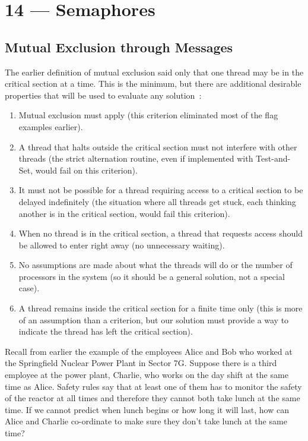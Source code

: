 \documentclass[a4paper]{report}
\begin{document}
\chapter*{14 --- Semaphores}


\section*{Mutual Exclusion through Messages}

The earlier definition of mutual exclusion said only that one thread may be in the critical section at a time. This is the minimum, but there are additional desirable properties that will be used to evaluate any solution~\cite{osi}:
\begin{enumerate}
	\item Mutual exclusion must apply (this criterion eliminated most of the flag examples earlier).
	\item A thread that halts outside the critical section must not interfere with other threads (the strict alternation routine, even if implemented with Test-and-Set, would fail on this criterion).
	\item It must not be possible for a thread requiring access to a critical section to be delayed indefinitely (the situation where all threads get stuck, each thinking another is in the critical section, would fail this criterion).
	\item When no thread is in the critical section, a thread that requests access should be allowed to enter right away (no unnecessary waiting).
	\item No assumptions are made about what the threads will do or the number of processors in the system (so it should be a general solution, not a special case).
	\item A thread remains inside the critical section for a finite time only (this is more of an assumption than a criterion, but our solution must provide a way to indicate the thread has left the critical section).
\end{enumerate}

Recall from earlier the example of the employees Alice and Bob who worked at the Springfield Nuclear Power Plant in Sector 7G.  Suppose there is a third employee at the power plant, Charlie, who works on the day shift at the same time as Alice. Safety rules say that at least one of them has to monitor the safety of the reactor at all times and therefore they cannot both take lunch at the same time. If we cannot predict when lunch begins or how long it will last, how can Alice and Charlie co-ordinate to make sure they don't take lunch at the same time?
\end{document}
